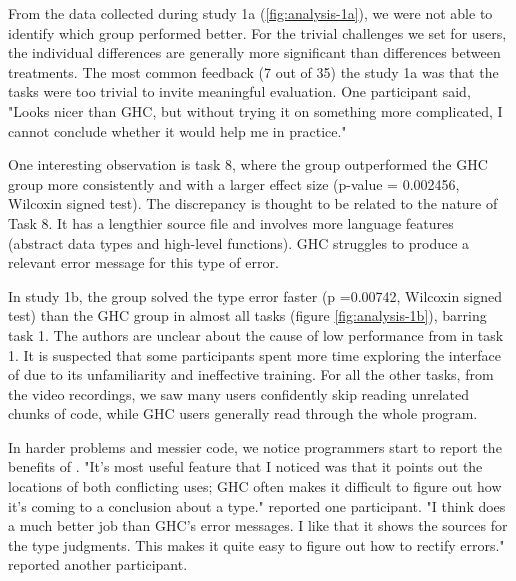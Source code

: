 From the data collected during study 1a (\ref{fig:analysis-1a}), we were not able to identify which group performed better. For the trivial challenges we set for users, the individual differences are generally more significant than differences between treatments. The most common feedback (7 out of 35) the study 1a was that the tasks were too trivial to invite meaningful evaluation. One participant said, "Looks nicer than GHC, but without trying it on something more complicated, I cannot conclude whether it would help me in practice."

One interesting observation is task 8, where the \chameleon{} group outperformed the GHC group more consistently and with a larger effect size (p-value = 0.002456, Wilcoxin signed test). The discrepancy is thought to be related to the nature of Task 8. It has a lengthier source file and involves more language features (abstract data types and high-level functions). GHC struggles to produce a relevant error message for this type of error.

In study 1b, the \chameleon{} group solved the type error faster (p =0.00742, Wilcoxin signed test) than the GHC group in almost all tasks (figure \ref{fig:analysis-1b}), barring task 1. The authors are unclear about the cause of low performance from \chameleon{} in task 1. It is suspected that some participants spent more time exploring the interface of \chameleon{} due to its unfamiliarity and ineffective training. For all the other tasks, from the video recordings, we saw many \chameleon{} users confidently skip reading unrelated chunks of code, while GHC users generally read through the whole program.

In harder problems and messier code, we notice programmers start to report the benefits of \chameleon{}. "It's most useful feature that I noticed was that it points out the locations of both conflicting uses; GHC often makes it difficult to figure out how it's coming to a conclusion about a type." reported one participant. "I think \chameleon{}  does a much better job than GHC's error messages. I like that it shows the sources for the type judgments. This makes it quite easy to figure out how to rectify errors." reported another participant.



